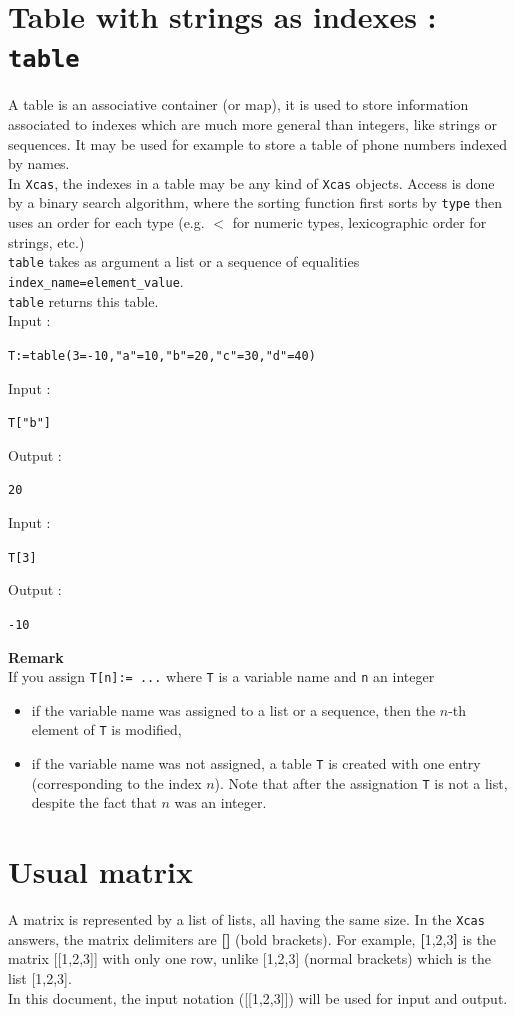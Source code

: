 \documentclass[a4paper,11pt]{book}
\begin{document}
\section{Table with strings as indexes : {\tt table}}
A table is an associative container (or map), it is used to store information
associated to indexes which are much more general than integers,
like strings or sequences. It may be used for example to store
a table of phone numbers indexed by names.\\
In {\tt Xcas}, the indexes in a table may be any kind of {\tt Xcas}
objects. Access is done by a binary search algorithm, where the
sorting function first sorts by {\tt type} then uses an order for
each type (e.g. $<$ for numeric types, lexicographic order for
strings, etc.)\\
{\tt table} takes as argument a list or a sequence of equalities
{\tt index\_name=element\_value}.\\
{\tt table} returns this table.\\
Input :
\begin{center}{\tt T:=table(3=-10,"a"=10,"b"=20,"c"=30,"d"=40)}\end{center}
Input :
\begin{center}{\tt T["b"]}\end{center}
Output :
\begin{center}{\tt 20}\end{center}
Input :
\begin{center}{\tt T[3]}\end{center}
Output :
\begin{center}{\tt -10}\end{center}
{\bf Remark}\\
If you assign {\tt T[n]:= ...} where {\tt T} is a variable name 
and {\tt n} an integer
\begin{itemize}
\item if the variable name was assigned to a list or a sequence, then the 
$n$-th element of {\tt T} is modified,
\item if the variable name was not assigned, a table {\tt T}
is created with one entry (corresponding to the index $n$). Note
that after the assignation {\tt T} is not a list, despite the fact that $n$
was an integer.
\end{itemize}

\section{Usual matrix}
A matrix is represented by a list of lists, all having the same size.
In the {\tt Xcas} answers, the matrix delimiters are {\bf []} (bold brackets).
For example, {\bf [}1,2,3{\bf ]} is the matrix [[1,2,3]] with only one row, 
unlike [1,2,3] (normal brackets) which is the list [1,2,3].\\
In this document, the input notation ([[1,2,3]]) will be used for input
and output.
\end{document}
